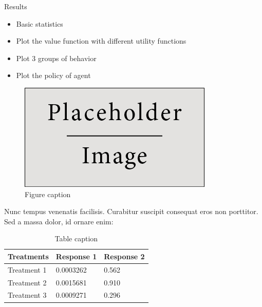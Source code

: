 \documentclass[final]{beamer}
\newlength{\onecolwid}
\newlength{\twocolwid}
\begin{document}
\begin{frame}
\begin{columns}[t]
\begin{column}{\twocolwid}
\begin{columns}[t,totalwidth=\twocolwid]
\begin{column}{\onecolwid}
\begin{exampleblock}{Results}
    \begin{itemize}
        \item Basic statistics
        \item Plot the value function with different utility functions
        \item Plot 3 groups of behavior
        \item Plot the policy of agent
    \end{itemize}

\begin{figure}
\includegraphics[width=0.8\linewidth]{img/placeholder.jpg}
\caption{Figure caption}
\end{figure}

Nunc tempus venenatis facilisis. Curabitur suscipit consequat eros non porttitor. Sed a massa dolor, id ornare enim:

\begin{table}
\vspace{2ex}
\begin{tabular}{l l l}
\toprule
\textbf{Treatments} & \textbf{Response 1} & \textbf{Response 2}\\
\midrule
Treatment 1 & 0.0003262 & 0.562 \\
Treatment 2 & 0.0015681 & 0.910 \\
Treatment 3 & 0.0009271 & 0.296 \\
\bottomrule
\end{tabular}
\caption{Table caption}
\end{table}

\end{exampleblock}


\end{column} %

\end{columns} %


\end{column}
\end{columns}
\end{frame}
\end{document}
